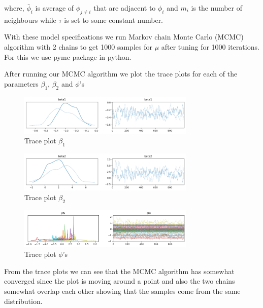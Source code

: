 \documentclass[enabledeprecatedfontcommands,parskip=half,twoside=semi,BCOR=0mm]{scrreprt}
\numberwithin{equation}{chapter}
\theoremstyle{definition}
\theoremstyle{remark}
\begin{document}
    where,
    \(\bar{\phi}_i\) is average of \(\phi_{j \neq i}\) that are adjacent to \(\phi_i\) and \(m_i\) is the number of neighbours while \(\tau\) is set to some constant number.
    
    With these model specifications we run Markov chain Monte Carlo (MCMC) algorithm with 2 chains to get 1000 samples for \(\mu\) after tuning for 1000 iterations. For this we use pymc package in python. 
    
    After running our MCMC algorithm we plot the trace plots for each of the parameters \(\beta_1\), \(\beta_2\) and \(\phi\)'s
    \begin{figure}[h]
    \centering
    \includegraphics[width=0.75\textwidth]{traceplot_beta1.png}
    \caption{Trace plot \(\beta_1\)}
    \label{fig:Figure 4}
    \end{figure}
    \begin{figure}[h]
    \centering
    \includegraphics[width=0.75\textwidth]{traceplot_beta2.png}
    \caption{Trace plot \(\beta_2\)}
    \label{fig:Figure 5}
    \end{figure}
    \begin{figure}[h]
    \centering
    \includegraphics[width=0.75\textwidth]{traceplot_phi.png}
    \caption{Trace plot \(\phi\)'s}
    \label{fig:Figure 6}
    \end{figure}

    From the trace plots we can see that the MCMC algorithm has somewhat converged since the plot is moving around a point and also the two chains somewhat overlap each other showing that the samples come from the same distribution.
\end{document}

